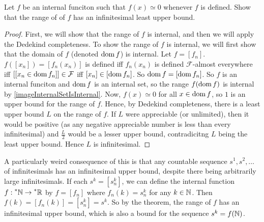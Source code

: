 \begin{thm}
    Let $f$ be an internal funciton such that $f(x) \simeq 0$ whenever $f$ is defined. Show that the range of of $f$ has an infinitesimal least upper bound.
\end{thm}

\begin{proof}
    First, we will show that the range of $f$ is internal, and then we will apply the Dedekind completeness. To show the range of $f$ is internal, we will first show that the domain of $f$ (denoted $\operatorname{dom} f$) is internal. Let $f = [f_n]$. $f([x_n]) = [f_n(x_n)]$ is defined iff $f_n(x_n)$ is defined $\mathcal{F}$-almost everywhere iff $[[x_n \in \operatorname{dom} f_n]] \in \mathcal{F}$ iff $[x_n] \in [\operatorname{dom} f_n]$. So $\operatorname{dom} f = [\operatorname{dom} f_n]$. So $f$ is an internal funciton and $\operatorname{dom} f$ is an internal set, so the range $f(\operatorname{dom} f)$ is internal by \autoref{imageInternalSetIsInternal}. Now, $f(x) \simeq 0$ for all $x \in \operatorname{dom} f$, so $1$ is an upper bound for the range of $f$. Hence, by Dedekind completeness, there is a least upper bound $L$ on the range of $f$. If $L$ were appreciable (or unlimited), then it would be positive (as any negative appreciable number is less than every infinitesimal) and $\frac{L}{2}$ would be a lesser upper bound, contradicitng $L$ being the least upper bound. Hence $L$ is infinitesimal.
\end{proof}

A particularly weird consequence of this is that any countable sequence $s^1, s^2, \ldots$ of infinitesimals has an infinitesimal upper bound, despite there being arbitrarily large infinitesimals. If each $s^k = [s^k_n]$, we can define the internal function $f: \prescript{*}{}{\mathbb{N}} \to \prescript{*}{}{\mathbb{R}}$ by $f = [f_n]$ where $f_n(k) = s^k_n$ for any $k \in \mathbb{N}$. Then $f(k) = [f_n(k)] = [s^k_n] = s^k$. So by the theorem, the range of $f$ has an infinitesimal upper bound, which is also a bound for the sequence $s^k = f(\mathbb{N})$. 

